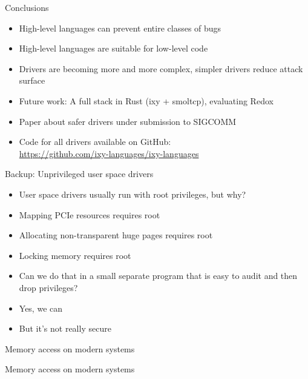 \documentclass[NET,english,aspectratio=169,notitleframe]{tumbeamer}
\begin{document}
\begin{frame}{Conclusions}
\begin{itemize}
\item High-level languages can prevent entire classes of bugs
\item High-level languages are suitable for low-level code
\item Drivers are becoming more and more complex, simpler drivers reduce attack surface
\item Future work: A full stack in Rust (ixy + smoltcp), evaluating Redox
\vspace{1em}
\item Paper about safer drivers under submission to SIGCOMM
\item Code for all drivers available on GitHub: \\\url{https://github.com/ixy-languages/ixy-languages}

\end{itemize}
\end{frame}

\begin{frame}{Backup: Unprivileged user space drivers}
\begin{itemize}
\item User space drivers usually run with root privileges, but why?
\pause
\vspace{1em}
\item Mapping PCIe resources requires root
\item Allocating non-transparent huge pages requires root
\item Locking memory requires root
\vspace{1em}
\item Can we do that in a small separate program that is easy to audit and then drop privileges?
\pause
\item Yes, we can
\item But it's not really secure
\end{itemize}
\end{frame}

\begin{frame}{Memory access on modern systems}
\centering
\end{frame}

\begin{frame}{Memory access on modern systems}
\centering
\end{frame}
\end{document}
